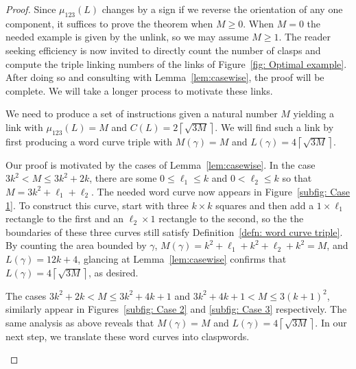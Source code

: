 \documentclass[11pt]{amsart}
\theoremstyle{remark}
\newcommand{\ceil}[1]{\left\lceil #1 \right\rceil}
\begin{document}
\begin{proof}
Since $\mu_{123}(L)$ changes by a sign if we reverse the orientation of any one component, it suffices to prove the theorem when $M\ge 0$.  When $M=0$ the needed example is given by the unlink, so we may assume $M\ge 1$.  The reader seeking efficiency is now invited to directly count the number of clasps and compute the triple linking numbers of the links of Figure~\ref{fig: Optimal example}.  After doing so and consulting with Lemma~\ref{lem:casewise}, the proof will be complete.  We will take a longer process to motivate these links.  

  We need to produce a set of instructions given a natural number $M$ yielding a link with $\mu_{123}(L)=M$ and \(C(L)=2\ceil{\sqrt{3M}}\).  We will find such a link by first producing a word curve triple with $M(\gamma)=M$ and $L(\gamma) = 4\ceil{\sqrt{3M}}$.   %
 
Our proof is motivated by the cases of Lemma~\ref{lem:casewise}.     In the case $3k^2<M\le 3k^2+2k$, there are some $0\le \ell_1\le k$ and $0<\ell_2\le k$ so that $M=3k^2+\ell_1+\ell_2$.  The needed word curve now appears in Figure~\ref{subfig: Case 1}.  To construct this curve, start with three $k\times k$ squares and then add a $1\times \ell_1$ rectangle to the first and an $\ell_2\times 1$ rectangle to the second, so the the boundaries of these three curves still satisfy Definition~\ref{defn: word curve triple}.  By counting the area bounded by $\gamma$, $M(\gamma)  =k^2+\ell_1+k^2+\ell_2+k^2 = M$, and $L(\gamma) = 12k+4$, glancing at Lemma~\ref{lem:casewise} confirms that $L(\gamma) = 4\ceil{\sqrt{3M}}$, as desired.

The cases $3k^2+2k<M\le 3k^2+4k+1$ and $3k^2+4k+1<M\le 3(k+1)^2$, similarly appear in Figures~\ref{subfig: Case 2} and \ref{subfig: Case 3} respectively.  The same analysis as above reveals that $M(\gamma)=M$ and $L(\gamma) = 4\ceil{\sqrt{3M}}$.  In our next step, we translate these word curves into claspwords.

\begin{figure}[htb]


\end{figure}
\end{proof}
\end{document}
